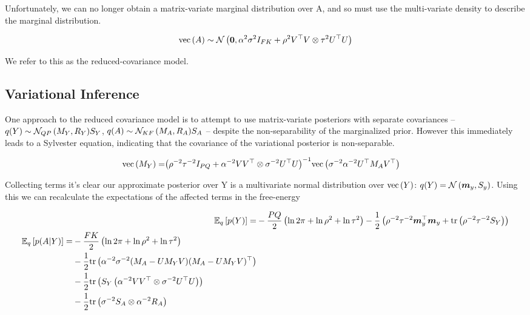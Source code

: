 Unfortunately, we can no longer obtain a matrix-variate marginal distribution over A, and so must use the multi-variate density to describe the marginal distribution.  

\begin{align}
\text{vec}\left(A\right) \sim \mathcal{N} \left( {\bm 0}, {\alpha^2 \sigma^2 I_{FK} + \rho^2 V^\top V \otimes \tau^2 U^\top U} \right)
\end{align}

We refer to this as the reduced-covariance model.

\subsection{Variational Inference}
One approach to the reduced covariance model is to attempt to use matrix-variate posteriors with separate covariances -- $q(Y) \sim { \mathcal{N}_{QP}\left({M_Y},{R_Y}\right) }{S_Y}$, $q(A) \sim { \mathcal{N}_{KF}\left({M_A},{R_A}\right) }{S_A}$ --  despite the non-separability of the marginalized prior. However this immediately leads to a Sylvester equation, indicating that the covariance of the variational posterior is non-separable.

\begin{align}
\text{vec}\left(M_Y\right) = & {\left( \rho^{-2}\tau^{-2} I_{PQ} + \alpha^{-2}V V^\top \otimes \sigma^{-2} U ^\top U \right)}^{-1}\text{vec}\left(\sigma^{-2}\alpha^{-2} U^\top M_A V^\top\right)
\end{align}

Collecting terms it's clear our approximate posterior over Y is a multivariate normal distribution over $\text{vec}\left(Y\right)$: $q(Y) = \mathcal{N} \left( {\bm m_y}, {S_y} \right)$. Using this we can recalculate the expectations of the affected terms in the free-energy

\begin{align}
\ex{p(Y)}{q} = & -\halve{PQ}\left(\ln 2\pi + \ln \rho^2 + \ln \tau^2\right) - \half \left(\rho^{-2}\tau^{-2} \vv{m}_y\T\vv{m}_y + \Tr{\rho^{-2}\tau^{-2} S_Y}\right) \\
\begin{split}
\ex{p(A|Y)}{q} = & -\halve{FK}\left(\ln 2\pi + \ln \rho^2 + \ln \tau^2\right) \\
 & -\half \Tr{\alpha^{-2}\sigma^{-2}(M_A - U M_Y V)(M_A - U M_Y V)\T} \\
 & -\half \Tr{S_Y \left(\alpha^{-2}V V\T \otimes \sigma^{-2}U \T U\right)} \\
 & -\half \Tr{\sigma^{-2}S_A\otimes \alpha^{-2}R_A}
 \label{eqn:free_enery_u_and_v}
\end{split}
\end{align}

